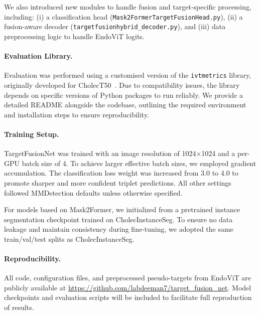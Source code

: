 We also introduced new modules to handle fusion and target-specific processing, including: (i) a classification head (\texttt{Mask2FormerTargetFusionHead.py}), (ii) a fusion-aware decoder \newline (\texttt{targetfusionhybrid\_decoder.py}), and (iii) data preprocessing logic to handle EndoViT logits.

\paragraph{Evaluation Library.}
Evaluation was performed using a customised version of the \texttt{ivtmetrics} library, originally developed for CholecT50~\cite{NWOYE2022102433_rendevous}. Due to compatibility issues, the library depends on specific versions of Python packages to run reliably. We provide a detailed README alongside the codebase, outlining the required environment and installation steps to ensure reproducibility.



\paragraph{Training Setup.}
TargetFusionNet was trained with an image resolution of 1024$\times$1024 and a per-GPU batch size of 4. To achieve larger effective batch sizes, we employed gradient accumulation. The classification loss weight was increased from 3.0 to 4.0 to promote sharper and more confident triplet predictions. All other settings followed MMDetection defaults unless otherwise specified.

For models based on Mask2Former, we initialized from a pretrained instance segmentation checkpoint trained on CholecInstanceSeg. To ensure no data leakage and maintain consistency during fine-tuning, we adopted the same train/val/test splits as CholecInstanceSeg.



\paragraph{Reproducibility.}
All code, configuration files, and preprocessed pseudo-targets from EndoViT are publicly available at \url{https://github.com/labdeeman7/target_fusion_net}.  Model checkpoints and evaluation scripts will be included to facilitate full reproduction of results.




